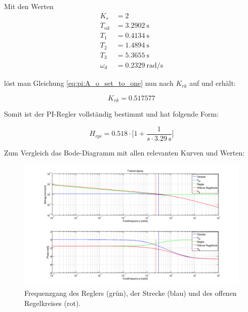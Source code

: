 Mit den Werten
\begin{equation} \label{eq:pi:values}
    \begin{split}
        K_s      & = 2                    \\
        T_{nk}   & = \SI{3.2902}{\second} \\
        T_1      & = \SI{0.4134}{\second} \\
        T_2      & = \SI{1.4894}{\second} \\
        T_3      & = \SI{5.3655}{\second} \\
        \omega_d & = \SI{0.2329}{\radian\per\second}
    \end{split}
\end{equation}

l\"ost  man Gleichung  \ref{eq:pi:A_o_set_to_one}  nun nach  $K_{rk}$ auf  und
erh\"alt:

\begin{equation} \label{eq:pi:k_rk_result}
    K_{rk} = 0.517577
\end{equation}

Somit ist der PI-Regler vollst\"andig bestimmt und hat folgende Form:

\begin{equation} \label{eq:pi:result}
    H_{rpi} = 0.518 \cdot \biggl[ 1 + \frac{1}{s \cdot \SI{3.29}{\second}} \biggr]
\end{equation}

Zum Vergleich das Bode-Diagramm mit allen relevanten Kurven und Werten:
\begin{figure}[h! width=\pagewidth]
    \includegraphics[width=.9\textwidth]{images/piBode.png}
    \caption{%
        Frequenzgang des Reglers (gr\"un), der  Strecke (blau) und des offenen
        Regelkreises (rot).
    }
    \label{fig:pi:all}
\end{figure}



